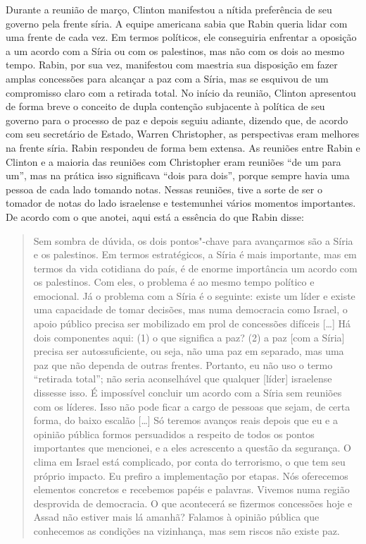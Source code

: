 Durante a reunião de março, Clinton manifestou a nítida preferência de
seu governo pela frente síria. A equipe americana sabia que Rabin queria
lidar com uma frente de cada vez. Em termos políticos, ele conseguiria
enfrentar a oposição a um acordo com a Síria ou com os palestinos, mas
não com os dois ao mesmo tempo. Rabin, por sua vez, manifestou com
maestria sua disposição em fazer amplas concessões para alcançar a paz
com a Síria, mas se esquivou de um compromisso claro com a retirada
total. No início da reunião, Clinton apresentou de forma breve o
conceito de dupla contenção subjacente à política de seu governo para o
processo de paz e depois seguiu adiante, dizendo que, de acordo com seu
secretário de Estado, Warren Christopher, as perspectivas eram melhores
na frente síria. Rabin respondeu de forma bem extensa. As reuniões entre
Rabin e Clinton e a maioria das reuniões com
Christopher eram reuniões ``de um para um'', mas na prática isso
significava ``dois para dois'', porque sempre havia uma pessoa de cada
lado tomando notas. Nessas reuniões, tive a sorte de ser o tomador de
notas do lado israelense e testemunhei vários momentos importantes. De
acordo com o que anotei, aqui está a essência do que Rabin disse:

\begin{quote}
Sem sombra de dúvida, os dois pontos"-chave para avançarmos são a Síria e
os palestinos. Em termos estratégicos, a Síria é mais importante, mas em
termos da vida cotidiana do país, é de enorme importância um acordo com
os palestinos. Com eles, o problema é ao mesmo tempo político e
emocional. Já o problema com a Síria é o seguinte: existe um líder e
existe uma capacidade de tomar decisões, mas numa democracia como
Israel, o apoio público precisa ser mobilizado em prol de concessões
difíceis {[}\ldots{}{]} Há dois componentes aqui: (1) o que significa a paz? (2) a paz
{[}com a Síria{]} precisa ser autossuficiente, ou seja, não uma paz em
separado, mas uma paz que não dependa de outras frentes. Portanto, eu
não uso o termo ``retirada total''; não seria aconselhável que qualquer
{[}líder{]} israelense dissesse isso. É impossível concluir um acordo
com a Síria sem reuniões com os líderes. Isso não pode ficar a cargo de
pessoas que sejam, de certa forma, do baixo escalão {[}\ldots{}{]} Só teremos avanços reais
depois que eu e a opinião pública formos persuadidos a respeito de todos
os pontos importantes que mencionei, e a eles acrescento a questão da
segurança. O clima em Israel está complicado, por conta do terrorismo, o
que tem seu próprio impacto. Eu prefiro a implementação por etapas. Nós
oferecemos elementos concretos e recebemos papéis e palavras. Vivemos
numa região desprovida de democracia. O que acontecerá se fizermos
concessões hoje e Assad não estiver mais lá amanhã? Falamos à opinião
pública que conhecemos as condições na vizinhança, mas sem riscos não
existe paz.
\end{quote}

